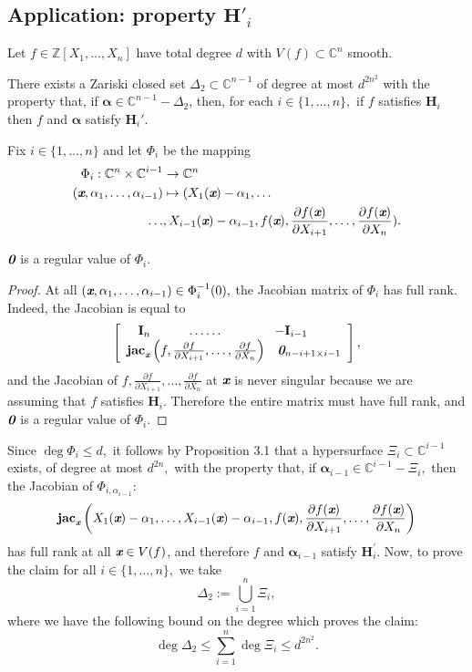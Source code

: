 \documentclass[sigconf]{acmart}
\def\bz{\textit{\textbf{0}}}
\def\xb{\textit{\textbf{x}}}
\def\C{\mathbb{C}}
\def\jac{ \textbf{jac}}
\def\bI{\textbf{I}}
\def\pa{\partial}
\newcommand{\ZZ}{{\mathbb{Z}}}
\begin{document}

\subsection{Application: property $\textbf{H}'_i$}
%
Let $f \in \ZZ[X_1,\hdots,X_n]$ have total degree $d$ with $V(f) \subset \C^n$ smooth. 
%
\begin{theorem}
  There exists a Zariski closed set $\Delta_2 \subset \C^{n-1}$ of
  degree at most $d^{2n^2}$ with the property that, if $\bm\alpha \in \C^{n-1} - \Delta_2$, then, for each $i \in \{1,\hdots,n\},$ if $f$ satisfies $\textbf{H}_i$ then $f$ and $\bm \alpha$ satisfy
  $\textbf{H}_i'$.
\end{theorem}
%
Fix $i \in \{1,\hdots,n\}$ and let $\Phi_i$ be the mapping 
%
\begin{align*}
    \Phi_i: \C^n \times \C^{i-1} &\rightarrow \C^{n} \\
           (\xb,\alpha_1,\hdots,\alpha_{i-1}) &\mapsto 
       (X_1(\xb)-\alpha_1,\hdots \\
       \hdots &,X_{i-1}(\xb)-\alpha_{i-1}, f(\xb),\frac{\pa f(\xb)}{\pa X_{i+1}},\hdots,\frac{\pa f(\xb)}{\pa X_n} ).
\end{align*}
%
\begin{proposition}
$\bz$ is a regular value of $\Phi_i.$
\end{proposition} 
\begin{proof}
At all $(\xb,\alpha_1,\hdots,\alpha_{i-1}) \in \Phi_i^{-1}(0),$ the Jacobian matrix of $\Phi_i$ has full rank. Indeed, the Jacobian is equal to
\[
\left[ 
\begin{array}{cc}
\hspace{-9mm}\bI_n\hspace{10mm}\hdots \hdots&\hspace{-10mm}-\bI_{i-1}\\
\jac_{\xb}\left(f,\frac{\pa
  f}{\pa X_{i+1}},\hdots,\frac{\pa f}{\pa X_n}\right)&\bz_{n-i+1\times i-1}
\end{array}
\right], 
\] 
and the Jacobian of $f,\frac{\pa
  f}{\pa X_{i+1}},\hdots,\frac{\pa f}{\pa X_n}$ at $\xb$ is never singular because we are assuming that $f$ satisfies $\textbf{H}_i$. Therefore the entire matrix must have full rank, and $\bz$ is a regular value of $\Phi_i.$
\end{proof}
%
Since $\deg \Phi_i \leq d,$ it follows by Proposition 3.1 that a hypersurface $\Xi_i \subset \C^{i-1}$ exists, of degree at most $d^{2n},$ with the property that, if $\bm \alpha_{i-1} \in \C^{i-1}-\Xi_i,$ then the Jacobian of $\Phi_{i,\alpha_{i-1}}$:
%
\[
 \jac_{\xb} \left(X_1(\xb)-\alpha_1,\hdots 
       ,X_{i-1}(\xb)-\alpha_{i-1}, f(\xb),\frac{\pa f(\xb)}{\pa X_{i+1}},\hdots,\frac{\pa f(\xb)}{\pa X_n}\right)
\]
has full rank at all $\xb \in V(f)$, and therefore $f$ and $\bm \alpha_{i-1}$ satisfy $\textbf{H}_i^{'}$. Now, to prove the claim for all $i \in \{1,\hdots,n\},$ we take
\[
\Delta_2 := \bigcup_{i=1}^n \Xi_i,
\]
where we have the following bound on the degree which proves the claim:
\[
\deg \Delta_2 \leq \sum_{i=1}^n \deg \Xi_i  \leq d^{2n^2}.
\] 
\end{document}
